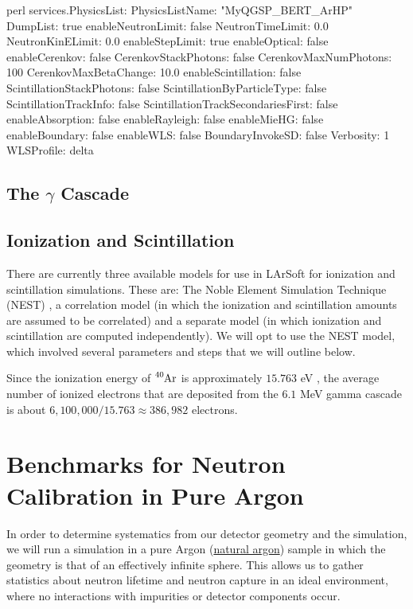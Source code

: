 \documentclass[8pt]{refart}
\begin{document}
\begin{code}{perl}
services.PhysicsList:{
    PhysicsListName: "MyQGSP_BERT_ArHP"
    DumpList: true
    enableNeutronLimit: false
    NeutronTimeLimit: 0.0
    NeutronKinELimit: 0.0
    enableStepLimit: true
    enableOptical: false
    enableCerenkov: false
    CerenkovStackPhotons: false
    CerenkovMaxNumPhotons: 100
    CerenkovMaxBetaChange: 10.0
    enableScintillation: false
    ScintillationStackPhotons: false
    ScintillationByParticleType: false
    ScintillationTrackInfo: false
    ScintillationTrackSecondariesFirst: false
    enableAbsorption: false
    enableRayleigh: false
    enableMieHG: false
    enableBoundary: false
    enableWLS: false
    BoundaryInvokeSD: false
    Verbosity: 1
    WLSProfile: delta
}
\end{code}

\subsection{The $\gamma$ Cascade}




\subsection{Ionization and Scintillation}
There are currently three available models for use in LArSoft for ionization and scintillation simulations.  These are: The Noble Element Simulation Technique (NEST) \cite{NEST1}, a correlation model (in which the ionization and scintillation amounts are assumed to be correlated) and a separate model (in which ionization and scintillation are computed independently).  We will opt to use the NEST model, which involved several parameters and steps that we will outline below.

Since the ionization energy of $\ce{^{40}Ar}$ is approximately $15.763$ eV \cite{Weitzel}, the average number of ionized electrons that are deposited from the $6.1$ MeV gamma cascade is about $6,100,000/15.763 \approx 386,982$ electrons.




\section{Benchmarks for Neutron Calibration in Pure Argon}
In order to determine systematics from our detector geometry and the simulation, we will run a simulation in a pure Argon (\hyperref[naturalargon]{natural argon}) sample in which the geometry is that of an effectively infinite sphere.  This allows us to gather statistics about neutron lifetime and neutron capture in an ideal environment, where no interactions with impurities or detector components occur. 
\end{document}
